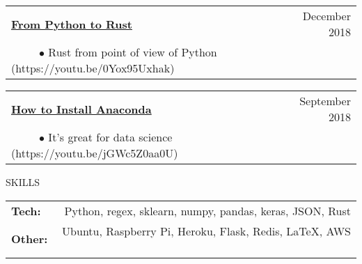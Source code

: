 \documentclass[11pt]{article}
\begin{document}
\begin{tabularx}{\linewidth}{l X r}
\textbf{\href{https://youtu.be/0Yox95Uxhak}{From Python to Rust}} & & December 2018 \\
~~~~~$\bullet$ Rust from point of view of Python (https://youtu.be/0Yox95Uxhak)\\
\end{tabularx}

\begin{tabularx}{\linewidth}{l X r}
\textbf{\href{https://youtu.be/jGWc5Z0aa0U}{How to Install Anaconda}} & & September 2018 \\
~~~~~$\bullet$ It's great for data science (https://youtu.be/jGWc5Z0aa0U)\\
\end{tabularx}


\vspace {.8cm}


{SKILLS}
\vspace{0.4cm}

\begin{tabularx}{\linewidth}{X r}
\textbf{Tech:} & Python, regex, sklearn, numpy, pandas, keras, JSON, Rust \\
\textbf{Other:} & Ubuntu, Raspberry Pi, Heroku, Flask, Redis,  \LaTeX, AWS \
\end{tabularx}
\end{document}
